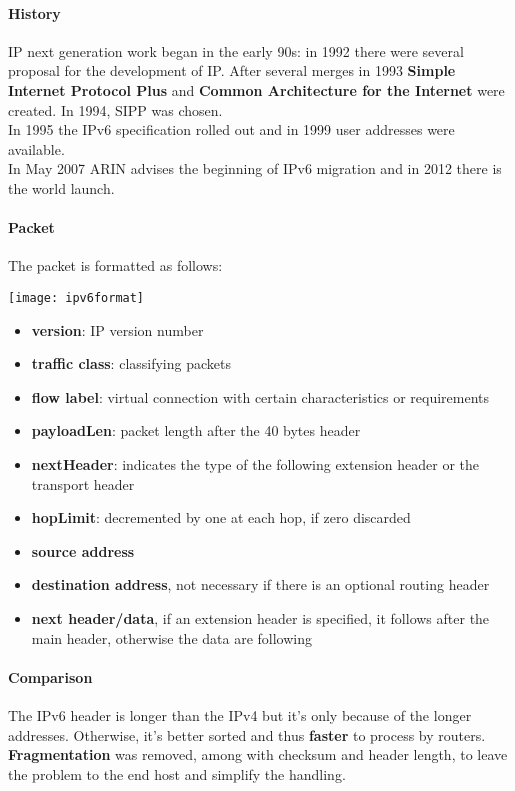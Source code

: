 \paragraph{History} IP next generation work began in the early 90s: in 1992 there were several proposal for the development of IP. After several merges in 1993 \textbf{Simple Internet Protocol Plus} and \textbf{Common Architecture for the Internet} were created. In 1994, SIPP was chosen.\\
In 1995 the IPv6 specification rolled out and in 1999 user addresses were available. \\
In May 2007 ARIN advises the beginning of IPv6 migration and in 2012 there is the world launch.

\paragraph{Packet} The packet is formatted as follows:
\begin{center}
	\texttt{[image: ipv6format]}
\end{center}

\begin{itemize}
	\item \textbf{version}: IP version number
	\item \textbf{traffic class}: classifying packets
	\item \textbf{flow label}: virtual connection with certain characteristics or requirements
	\item \textbf{payloadLen}: packet length after the 40 bytes header
	\item \textbf{nextHeader}: indicates the type of the following extension header or the transport header
	\item \textbf{hopLimit}: decremented by one at each hop, if zero discarded
	\item \textbf{source address}
	\item \textbf{destination address}, not necessary if there is an optional routing header
	\item \textbf{next header/data}, if an extension header is specified, it follows after the main header, otherwise the data are following
\end{itemize}

\paragraph{Comparison} The IPv6 header is longer than the IPv4 but it's only because of the longer addresses. Otherwise, it's better sorted and thus \textbf{faster} to process by routers.\\
\textbf{Fragmentation} was removed, among with checksum and header length, to leave the problem to the end host and simplify the handling.

